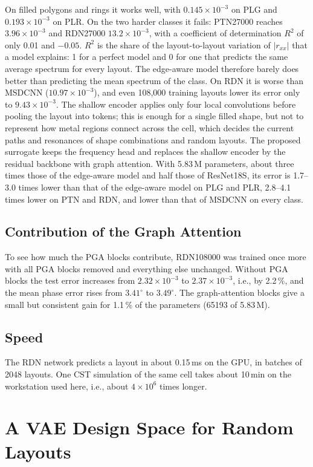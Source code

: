 \documentclass[journal]{IEEEtran}
\newcommand{\e}[2]{#1{\times}10^{#2}}
\begin{document}
On filled polygons and rings it works well, with $\e{0.145}{-3}$ on PLG and $\e{0.193}{-3}$ on PLR. On the two harder classes it fails: PTN27000 reaches $\e{3.96}{-3}$ and RDN27000 $\e{13.2}{-3}$, with a coefficient of determination $R^2$ of only 0.01 and $-0.05$. $R^2$ is the share of the layout-to-layout variation of $|r_{xx}|$ that a model explains: 1 for a perfect model and 0 for one that predicts the same average spectrum for every layout. The edge-aware model therefore barely does better than predicting the mean spectrum of the class. On RDN it is worse than MSDCNN ($\e{10.97}{-3}$), and even 108,000 training layouts lower its error only to $\e{9.43}{-3}$. The shallow encoder applies only four local convolutions before pooling the layout into tokens; this is enough for a single filled shape, but not to represent how metal regions connect across the cell, which decides the current paths and resonances of shape combinations and random layouts. The proposed surrogate keeps the frequency head and replaces the shallow encoder by the residual backbone with graph attention. With 5.83\,M parameters, about three times those of the edge-aware model and half those of ResNet18S, its error is 1.7--3.0 times lower than that of the edge-aware model on PLG and PLR, 2.8--4.1 times lower on PTN and RDN, and lower than that of MSDCNN on every class.

\subsection{Contribution of the Graph Attention}
To see how much the PGA blocks contribute, RDN108000 was trained once more with all PGA blocks removed and everything else unchanged. Without PGA blocks the test error increases from $\e{2.32}{-3}$ to $\e{2.37}{-3}$, i.e., by 2.2\,\%, and the mean phase error rises from $3.41^\circ$ to $3.49^\circ$. The graph-attention blocks give a small but consistent gain for 1.1\,\% of the parameters (\num{65193} of 5.83\,M).

\subsection{Speed}
The RDN network predicts a layout in about 0.15\,ms on the GPU, in batches of 2048 layouts. One CST simulation of the same cell takes about 10\,min on the workstation used here, i.e., about $4\times10^6$ times longer.

\section{A VAE Design Space for Random Layouts}\label{sec:vae}
\end{document}
